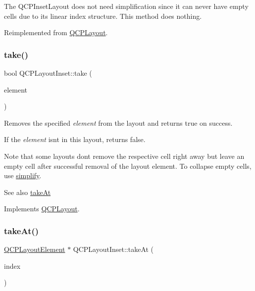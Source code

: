The Q\+C\+P\+Inset\+Layout does not need simplification since it can never have empty cells due to its linear index structure. This method does nothing. 

Reimplemented from \mbox{\hyperlink{class_q_c_p_layout_a41e6ac049143866e8f8b4964efab01b2}{Q\+C\+P\+Layout}}.

\mbox{\label{class_q_c_p_layout_inset_af7f13cc369f8190b5e7e17d5f39dfe1c}} 
\subsubsection{\texorpdfstring{take()}{take()}}
{\footnotesize\ttfamily bool Q\+C\+P\+Layout\+Inset\+::take (\begin{DoxyParamCaption}\item[{\mbox{\hyperlink{class_q_c_p_layout_element}{Q\+C\+P\+Layout\+Element}} $\ast$}]{element }\end{DoxyParamCaption})\hspace{0.3cm}{\ttfamily [virtual]}}

Removes the specified {\itshape element} from the layout and returns true on success.

If the {\itshape element} isn\textquotesingle{}t in this layout, returns false.

Note that some layouts don\textquotesingle{}t remove the respective cell right away but leave an empty cell after successful removal of the layout element. To collapse empty cells, use \mbox{\hyperlink{class_q_c_p_layout_inset_a18b7d508f0baa60cc5dcb1343cf7f32a}{simplify}}.

\begin{DoxySeeAlso}{See also}
\mbox{\hyperlink{class_q_c_p_layout_inset_abf2e8233f5b7051220907e62ded490a2}{take\+At}} 
\end{DoxySeeAlso}


Implements \mbox{\hyperlink{class_q_c_p_layout_ada26cd17e56472b0b4d7fbbc96873e4c}{Q\+C\+P\+Layout}}.

\mbox{\label{class_q_c_p_layout_inset_abf2e8233f5b7051220907e62ded490a2}} 
\subsubsection{\texorpdfstring{takeAt()}{takeAt()}}
{\footnotesize\ttfamily \mbox{\hyperlink{class_q_c_p_layout_element}{Q\+C\+P\+Layout\+Element}} $\ast$ Q\+C\+P\+Layout\+Inset\+::take\+At (\begin{DoxyParamCaption}\item[{int}]{index }\end{DoxyParamCaption})\hspace{0.3cm}{\ttfamily [virtual]}}

